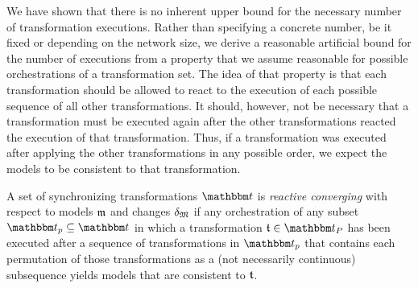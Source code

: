 We have shown that there is no inherent upper bound for the necessary number of transformation executions.
Rather than specifying a concrete number, be it fixed or depending on the network size, we derive a reasonable artificial bound for the number of executions from a property that we assume reasonable for possible orchestrations of a transformation set.
The idea of that property is that each transformation should be allowed to react to the execution of each possible sequence of all other transformations.
It should, however, not be necessary that a transformation must be executed again after the other transformations reacted the execution of that transformation.
Thus, if a transformation was executed after applying the other transformations in any possible order, we expect the models to be consistent to that transformation.

\begin{definition}
    \label{def:reactiveconverging}
    A set of synchronizing transformations $\transformationset{T}$ is \emph{reactive converging} with respect to models $\modeltuple{m}$ and changes $\changetuple{\metamodeltuple{M}}$ if any orchestration of any subset $\transformationset{T}_p \subseteq \transformationset{T}$ in which a transformation $\transformation{t} \in \transformationset{T}_P$ has been executed after a sequence of transformations in $\transformationset{T}_p$ that contains each permutation of those transformations as a (not necessarily continuous) subsequence yields models that are consistent to $\transformation{t}$.
\end{definition}

